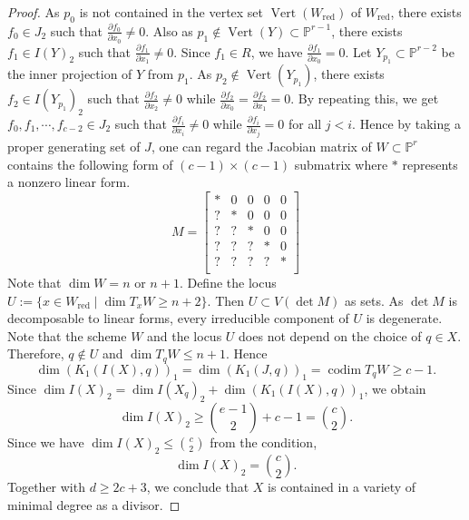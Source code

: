 \documentclass[10pt,a4paper]{amsart}
\def \codim {\operatorname{codim}}
\def \det {\operatorname{det}}
\def \p {\mathbb{P}}
\def \ver {\operatorname{Vert}}
\begin{document}
\begin{proof}
    As $p_0$ is not contained in the vertex set $\ver(W_{\text{red}})$ of $W_{\text{red}}$, there exists $f_0\in J_2$ such that $\frac{\partial f_0}{\partial x_0}\neq 0$.
    Also as $p_1\notin\ver(Y)\subset\p^{r-1}$, there exists $f_1\in I(Y)_2$ such that $\frac{\partial f_1}{\partial x_1}\neq 0$. Since $f_1\in R$, we have $\frac{\partial f_1}{\partial x_0}=0$.
    Let $Y_{p_1}\subset\p^{r-2}$ be the inner projection of $Y$ from $p_1$.
    As $p_2\notin\ver(Y_{p_1})$, there exists $f_2\in I(Y_{p_1})_2$ such that $\frac{\partial f_2}{\partial x_2}\neq 0$ while $\frac{\partial f_2}{\partial x_0}=\frac{\partial f_2}{\partial x_1}=0$.
    By repeating this, we get $f_0,f_1,\cdots,f_{c-2}\in J_2$ such that $\frac{\partial f_i}{\partial x_i}\neq 0$ while $\frac{\partial f_i}{\partial x_j}=0$ for all $j<i$.
    Hence by taking a proper generating set of $J$, one can regard the Jacobian matrix of $W\subset\p^r$ contains the following form of $(c-1) \times (c-1)$ submatrix where $*$ represents a nonzero linear form.
    \[
    M=
    \begin{bmatrix}
        * & 0 & 0 & 0 & 0 \\
        ? & * & 0 & 0 & 0 \\
        ? & ? & * & 0 & 0 \\
        ? & ? & ? & * & 0 \\
        ? & ? & ? & ? & * \\
    \end{bmatrix}
    \]
    Note that $\dim W = n$ or $n+1$. Define the locus $U:=\{x\in W_{\text{red}}\mid \dim T_xW\geq n+2\}$.
    Then $U\subset V(\det M)$ as sets.
    As $\det M$ is decomposable to linear forms, every irreducible component of $U$ is degenerate.
    Note that the scheme $W$ and the locus $U$ does not depend on the choice of $q\in X$.
    Therefore, $q\notin U$ and $\dim T_qW\leq n+1$.
    Hence $$\dim (K_1(I(X),q))_1=\dim (K_1(J,q))_1=\codim T_qW\geq c-1.$$
    Since $\dim I(X)_2=\dim I(X_q)_2+\dim (K_1(I(X),q))_1$, we obtain
    $$\dim I(X)_2\geq\binom{e-1}{2}+c-1=\binom{c}{2}.$$
    Since we have $\dim I(X)_2\leq \binom{c}{2}$ from the condition, $$\dim I(X)_2=\binom{c}{2}.$$
    Together with $d\geq 2c+3$, we conclude that $X$ is contained in a variety of minimal degree as a divisor.
\end{proof}
\end{document}
